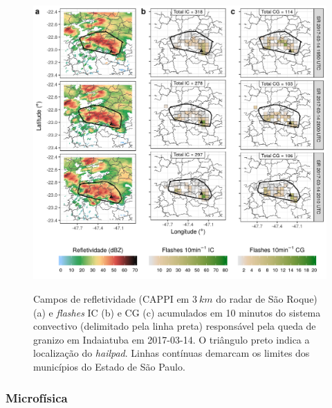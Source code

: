 \begin{figure}[htb]
	\centering
	\caption{Campos de refletividade (CAPPI em $3\:km$ do radar de São Roque) (a) e \textit{flashes} IC (b) e CG (c) acumulados em 10 minutos do sistema convectivo (delimitado pela linha preta) responsável pela queda de granizo em Indaiatuba em 2017-03-14. O triângulo preto indica a localização do \textit{hailpad}. Linhas contínuas demarcam os limites dos municípios do Estado de São Paulo.} 
	\label{dbz_flashes_20170314_2}
	\includegraphics[width=0.99\columnwidth]{../General_Processing/figures/clusters_flashes_2017-03-14_2000_ptbr.png} \\
\end{figure}

\subsubsection{Microfísica}\label{micro_201703014}

